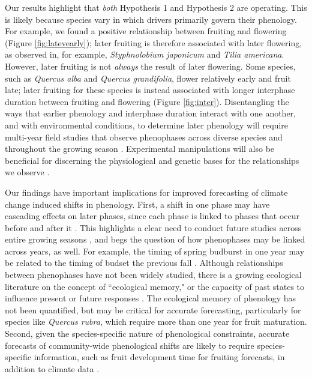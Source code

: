 \documentclass{article}
\begin{document}
\par Our results highlight that \textit{both} Hypothesis 1 and Hypothesis 2 are operating. This is likely because species vary in which drivers primarily govern their phenology. For example, we found a positive relationship between fruiting and flowering (Figure \ref{fig:latevearly}); later fruiting is therefore associated with later flowering, as observed in, for example, \textit{Styphnolobium japonicum} and \textit{Tilia americana}. However, later fruiting is not \textit{always} the result of later flowering. Some species, such as \textit{Quercus alba} and \textit{Quercus grandifolia}, flower relatively early and fruit late; later fruiting for these species is instead associated with longer interphase duration between fruiting and flowering (Figure \ref{fig:inter}). Disentangling the ways that earlier phenology and interphase duration interact with one another, and with environmental conditions, to determine later phenology will require multi-year field studies that observe phenophases across diverse species and throughout the growing season \citep[e.g.][]{elmendorf2016}. Experimental manipulations will also be beneficial for discerning the physiological and genetic bases for the relationships we observe \citep{flint1974}.

\par Our findings have important implications for improved forecasting of climate change induced shifts in phenology. First, a shift in one phase may have cascading effects on later phases, since each phase is linked to phases that occur before and after it \citep{wolkovich2014b}. This highlights a clear need to conduct future studies across entire growing seasons \citep{wolkovich2014}, and begs the question of how phenophases may be linked across years, as well.  For example, the timing of spring budburst in one year may be related to the timing of budset the previous fall \citep {mimura2010}. Although relationships between phenophases have not been widely studied, there is a growing ecological literature on the concept of ``ecological memory," or the capacity of past states to influence present or future responses \citep {ogle2015}. The ecological memory of phenology has not been quantified, but may be critical for accurate forecasting, particularly for species like \emph{Quercus rubra}, which require more than one year for fruit maturation. Second, given the species-specific nature of phenological constraints, accurate forecasts of community-wide phenological shifts are likely to require species-specific information, such as fruit development time for fruiting forecasts, in addition to climate data \citep{diez2012}.
\end{document}
